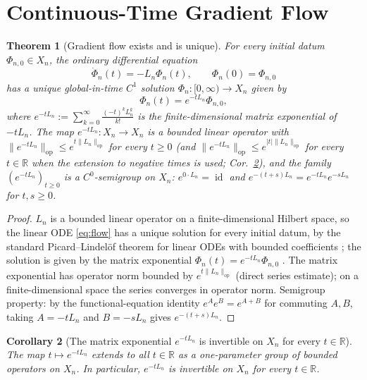 \documentclass[11pt, a4paper]{amsart}
\newtheorem{theorem}{Theorem}[section]
\newtheorem{corollary}[theorem]{Corollary}
\theoremstyle{definition}
\newcommand{\R}{\mathbb{R}}
\newcommand{\id}{\operatorname{id}}
\newcommand{\op}{\operatorname{op}}
\begin{document}
\section{Continuous-Time Gradient Flow}
\label{sec:continuous-flow}

\begin{theorem}[Gradient flow exists and is unique]
\label{thm:flow-exists}
For every initial datum $\Phi_{n, 0} \in X_n$, the ordinary
differential equation
\begin{equation}
\label{eq:flow}
  \dot \Phi_n(t) = -L_n \Phi_n(t), \qquad \Phi_n(0) = \Phi_{n, 0}
\end{equation}
has a unique global-in-time $C^1$ solution $\Phi_n \colon
[0, \infty) \to X_n$ given by
\[
  \Phi_n(t) = e^{-t L_n} \Phi_{n, 0},
\]
where $e^{-t L_n} := \sum_{k=0}^\infty \frac{(-t)^k L_n^k}{k!}$ is
the finite-dimensional matrix exponential of $-t L_n$. The map
$e^{-t L_n} \colon X_n \to X_n$ is a bounded linear operator with
$\|e^{-t L_n}\|_{\op} \leq e^{t \|L_n\|_{\op}}$ for every $t \geq 0$
(and $\|e^{-t L_n}\|_{\op} \leq e^{|t| \|L_n\|_{\op}}$ for every $t \in
\R$ when the extension to negative times is used;
Cor.~\ref{cor:flow-reversible}), and the family
$(e^{-t L_n})_{t \geq 0}$ is a $C^0$-semigroup on $X_n$:
$e^{0 \cdot L_n} = \id$ and $e^{-(t + s) L_n} = e^{-t L_n}
e^{-s L_n}$ for $t, s \geq 0$.
\end{theorem}

\begin{proof}
$L_n$ is a bounded linear operator on a finite-dimensional
Hilbert space, so the linear ODE \eqref{eq:flow} has a unique
solution for every initial datum, by the standard
Picard--Lindel\"of theorem for linear ODEs with bounded
coefficients \cite[Theorem~1.1]{CoddingtonLevinson}; the solution
is given by the matrix exponential
$\Phi_n(t) = e^{-t L_n} \Phi_{n, 0}$
\cite[\S 6.2]{HornJohnson}. The matrix exponential has operator
norm bounded by $e^{t\|L_n\|_{\op}}$ (direct series estimate); on a
finite-dimensional space the series converges in operator norm.
Semigroup property: by the functional-equation identity
$e^{A} e^{B} = e^{A+B}$ for commuting $A, B$, taking $A = -t L_n$
and $B = -s L_n$ gives $e^{-(t+s) L_n}$.
\end{proof}

\begin{corollary}[The matrix exponential $e^{-tL_n}$ is invertible
on $X_n$ for every $t \in \R$]
\label{cor:flow-reversible}
The map $t \mapsto e^{-t L_n}$ extends to all $t \in \R$ as a
one-parameter group of bounded operators on $X_n$. In particular,
$e^{-t L_n}$ is invertible on $X_n$ for every $t \in \R$.
\end{corollary}
\end{document}
